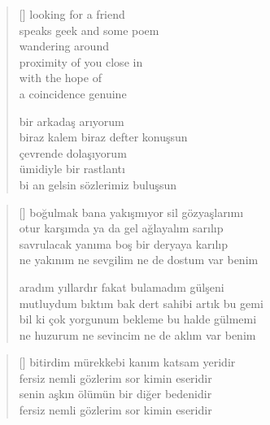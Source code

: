 \documentclass[10pt, openright, twoside]{memoir}
\theoremstyle{definition}
\begin{document}
\vspace*{\fill}
%
\newpage
{}
\vspace*{\fill}
\settowidth{\versewidth}{biraz kalem biraz defter konuşsun}
\begin{verse}[\versewidth]
  looking for a friend \\
  speaks geek and some poem \\
  wandering around \\
  proximity of you close in \\
  with the hope of \\
  a coincidence genuine

  bir arkadaş arıyorum \\
  biraz kalem biraz defter konuşsun \\
  çevrende dolaşıyorum \\
  ümidiyle bir rastlantı \\
  bi an gelsin sözlerimiz buluşsun
\end{verse}
\vspace*{\fill}
%
\newpage
{}
\vspace*{\fill}
\settowidth{\versewidth}{mutluydum bıktım bak dert sahibi artık bu gemi}
\begin{verse}[\versewidth]
  boğulmak bana yakışmıyor sil gözyaşlarımı \\
  otur karşımda ya da gel ağlayalım sarılıp \\
  savrulacak yanıma boş bir deryaya karılıp \\
  ne yakınım ne sevgilim ne de dostum var benim

  aradım yıllardır fakat bulamadım gülşeni \\
  mutluydum bıktım bak dert sahibi artık bu gemi \\
  bil ki çok yorgunum bekleme bu halde gülmemi \\
  ne huzurum ne sevincim ne de aklım var benim \\
\end{verse}
\vspace*{\fill}
%
\newpage
{}
\vspace*{\fill}
\settowidth{\versewidth}{fersiz nemli gözlerim sor kimin eseridir}
\begin{verse}[\versewidth]
  bitirdim mürekkebi kanım katsam yeridir \\
  fersiz nemli gözlerim sor kimin eseridir \\
  senin aşkın ölümün bir diğer bedenidir \\
  fersiz nemli gözlerim sor kimin eseridir
\end{verse}
\end{document}
